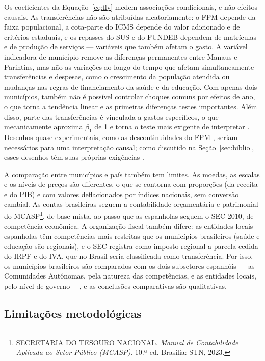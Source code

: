 Os coeficientes da Equação~\eqref{eq:fly} medem associações condicionais, e não efeitos causais. As transferências não são atribuídas aleatoriamente: o FPM depende da faixa populacional, a cota-parte do ICMS depende do valor adicionado e de critérios estaduais, e os repasses do SUS e do FUNDEB dependem de matrículas e de produção de serviços --- variáveis que também afetam o gasto. A variável indicadora de município remove as diferenças permanentes entre Manaus e Parintins, mas não as variações ao longo do tempo que afetam simultaneamente transferências e despesas, como o crescimento da população atendida ou mudanças nas regras de financiamento da saúde e da educação. Com apenas dois municípios, também não é possível controlar choques comuns por efeitos de ano, o que torna a tendência linear e as primeiras diferenças testes importantes. Além disso, parte das transferências é vinculada a gastos específicos, o que mecanicamente aproxima $\beta_1$ de 1 e torna o teste mais exigente de interpretar \cite{knight2002,megdal1987}. Desenhos quase-experimentais, como as descontinuidades do FPM \cite{brollo2013,litschig2013}, seriam necessários para uma interpretação causal; como discutido na Seção~\ref{sec:biblio}, esses desenhos têm suas próprias exigências \cite{baker2022,goodmanbacon2021}.

A comparação entre municípios e país também tem limites. As moedas, as escalas e os níveis de preços são diferentes, o que se contorna com proporções (da receita e do PIB) e com valores deflacionados por índices nacionais, sem conversão cambial. As contas brasileiras seguem a contabilidade orçamentária e patrimonial do MCASP\footnote{SECRETARIA DO TESOURO NACIONAL. \textit{Manual de Contabilidade Aplicada ao Setor Público (MCASP)}. 10.ª ed. Brasília: STN, 2023.}, de base mista, ao passo que as espanholas seguem o SEC 2010, de competência econômica. A organização fiscal também difere: as entidades locais espanholas têm competências mais restritas que os municípios brasileiros (saúde e educação são regionais), e o SEC registra como imposto regional a parcela cedida do IRPF e do IVA, que no Brasil seria classificada como transferência. Por isso, os municípios brasileiros são comparados com os dois subsetores espanhóis --- as Comunidades Autônomas, pela natureza das competências, e as entidades locais, pelo nível de governo ---, e as conclusões comparativas são qualitativas.

\subsection{Limitações metodológicas}

